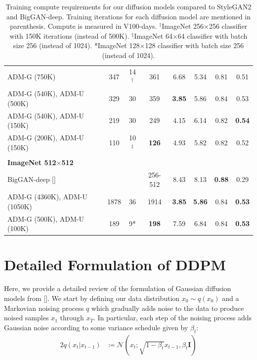 \documentclass{article}
\newcommand{\shortcite}[1]{[\citenum{#1}]}
\newcommand{\namecite}[1]{\citeauthor{#1} [\citenum{#1}]}
\begin{document}
\begin{table}[h]
\begin{center}
\begin{small}
\begin{tabular}{lccccccc}
    ADM-G (750K)                    & 347 & 14${}^\dagger$ & 361      & 6.68      & 5.34      & 0.81     & 0.51 \\
    ADM-G (540K), ADM-U (500K)      & 329 & 30 & 359      & \bf{3.85} & 5.86      & 0.84     & 0.53 \\
    ADM-G (540K), ADM-U (150K)      & 219 & 30 & 249      & 4.15      & 6.14      & 0.82	 & \bf{0.54} \\
    ADM-G (200K), ADM-U (150K)      & 110 & 10${}^\ddagger$ & \bf{126} & 4.93      & 5.82      & 0.82     & 0.52  \\
    \\
    \multicolumn{6}{l}{\bf{ImageNet} 512$\times$512} \\
    \toprule
    BigGAN-deep \shortcite{biggan}  & &    & 256-512 & 8.43      & 8.13      & \bf{0.88} & 0.29 \\
    ADM-G (4360K), ADM-U (1050K)   & 1878 & 36 & 1914 & \bf{3.85} & \bf{5.86} & 0.84      & \bf{0.53} \\
    ADM-G (500K), ADM-U (100K) & 189 & 9* & \bf{198} & 7.59 & 6.84 & 0.84 & \bf{0.53}  \\
    \bottomrule
    \end{tabular}
    \end{small}
    \end{center}
    \caption{Training compute requirements for our diffusion models compared to StyleGAN2 and BigGAN-deep. Training iterations for each diffusion model are mentioned in parenthesis. Compute is measured in V100-days. ${}^\dagger$ImageNet 256$\times$256 classifier with 150K iterations (instead of 500K). ${}^\ddagger$ImageNet 64$\times$64 classifier with batch size 256 (instead of 1024). *ImageNet 128$\times$128 classifier with batch size 256 (instead of 1024).}
    \label{tab:computecomparison}
    \vskip -0.2in
\end{table}
\clearpage
\section{Detailed Formulation of DDPM}
\label{app:detailedbackground}
Here, we provide a detailed review of the formulation of Gaussian diffusion models from \namecite{ddpm}. We start by defining our data distribution $x_0 \sim q(x_0)$ and a Markovian noising process $q$ which gradually adds noise to the data to produce noised samples $x_1$ through $x_T$. In particular, each step of the noising process adds Gaussian noise according to some variance schedule given by $\beta_t$:
%
\begin{alignat}{2}
q(x_t|x_{t-1}) &\coloneqq \mathcal{N}(x_t; \sqrt{1-\beta_t}x_{t-1}, \beta_t \mathbf{I})
\end{alignat}
\end{document}
